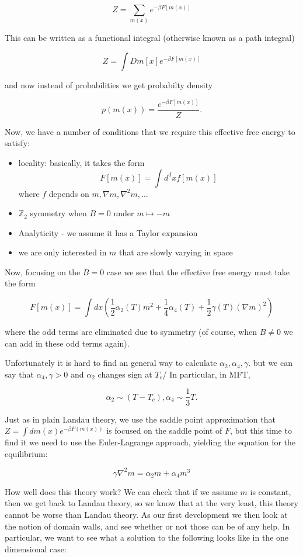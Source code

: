\documentclass{article}
\theoremstyle{definition}
\begin{document}
$$ Z = \sum_{m(x)} e^{-\beta F[m(x)]} $$

This can be written as a functional integral (otherwise known as a path integral)

$$ Z = \int Dm[x] e^{-\beta F[m(x)]} $$

and now instead of probabilities we get probabilty density

$$ p(m(x)) = \frac{e^{-\beta F[m(x)]}}{Z}. $$

Now, we have a number of conditions that we require this effective free energy
to satisfy:

\begin{itemize}
\item locality: basically, it takes the form
  $$ F[m(x)] = \int d^dx f[m(x)] $$
  where $f$ depends on $m, \nabla m, \nabla^2 m, \dots$
\item $\mathbb{Z}_2$ symmetry when $B = 0$ under $m \mapsto -m$
\item Analyticity - we assume it has a Taylor expansion
\item we are only interested in $m$ that are slowly varying in space
\end{itemize}

Now, focusing on the $B = 0$ case we see that the effective free energy must
take the form

$$ F[m(x)] = \int dx (\frac{1}{2} \alpha_2(T) m^2 + \frac{1}{4} \alpha_4(T) +
\frac{1}{2} \gamma(T) (\nabla m)^2) $$

where the odd terms are eliminated due to symmetry (of course, when $B \neq 0$
we can add in these odd terms again).

Unfortunately it is hard to find an general way to calculate $\alpha_2,
\alpha_4, \gamma$. but we can say that $\alpha_4, \gamma > 0$ and $\alpha_2$
changes sign at $T_c$/ In particular, in MFT,

$$ \alpha_2 \sim (T - T_c), \alpha_4 \sim \frac{1}{3} T. $$

Just as in plain Landau theory, we use the saddle point approximation that $Z =
\int dm(x) e^{-\beta F(m(x))}$ is focused on the saddle point of $F$, but this
time to find it we need to use the Euler-Lagrange approach, yielding the
equation for the equilibrium:

$$ \gamma \nabla^2 m = \alpha_2m + \alpha_4 m^3 $$

How well does this theory work? We can check that if we assume $m$ is constant,
then we get back to Landau theory, so we know that at the very least, this
theory cannot be worse than Landau theory. As our first development we then look
at the notion of domain walls, and see whether or not those can be of any help.
In particular, we want to see what a solution to the following looks like in the
one dimensional case:
\end{document}
